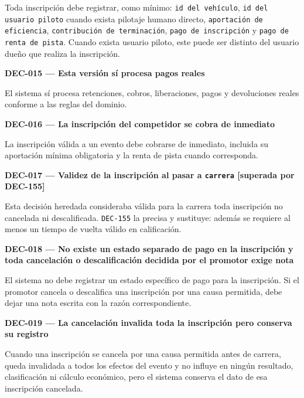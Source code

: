 \documentclass[10pt,letterpaper]{article}
\begin{document}
Toda inscripción debe registrar, como mínimo: \texttt{id del vehículo}, \texttt{id del usuario piloto} cuando exista pilotaje humano directo, \texttt{aportación de eficiencia}, \texttt{contribución de terminación}, \texttt{pago de inscripción} y \texttt{pago de renta de pista}. Cuando exista usuario piloto, este puede ser distinto del usuario dueño que realiza la inscripción.\par\vspace{0.45em}
\noindent\textbf{DEC-015 --- Esta versión sí procesa pagos reales}\par
El sistema sí procesa retenciones, cobros, liberaciones, pagos y devoluciones reales conforme a las reglas del dominio.\par\vspace{0.45em}
\noindent\textbf{DEC-016 --- La inscripción del competidor se cobra de inmediato}\par
La inscripción válida a un evento debe cobrarse de inmediato, incluida su aportación mínima obligatoria y la renta de pista cuando corresponda.\par\vspace{0.45em}
\noindent\textbf{DEC-017 --- Validez de la inscripción al pasar a \texttt{carrera} [superada por DEC-155]}\par
Esta decisión heredada consideraba válida para la carrera toda inscripción no cancelada ni descalificada. \texttt{DEC-155} la precisa y sustituye: además se requiere al menos un tiempo de vuelta válido en calificación.\par\vspace{0.45em}
\noindent\textbf{DEC-018 --- No existe un estado separado de pago en la inscripción y toda cancelación o descalificación decidida por el promotor exige nota}\par
El sistema no debe registrar un estado específico de pago para la inscripción. Si el promotor cancela o descalifica una inscripción por una causa permitida, debe dejar una nota escrita con la razón correspondiente.\par\vspace{0.45em}
\noindent\textbf{DEC-019 --- La cancelación invalida toda la inscripción pero conserva su registro}\par
Cuando una inscripción se cancela por una causa permitida antes de carrera, queda invalidada a todos los efectos del evento y no influye en ningún resultado, clasificación ni cálculo económico, pero el sistema conserva el dato de esa inscripción cancelada.\par\vspace{0.45em}
\end{document}
